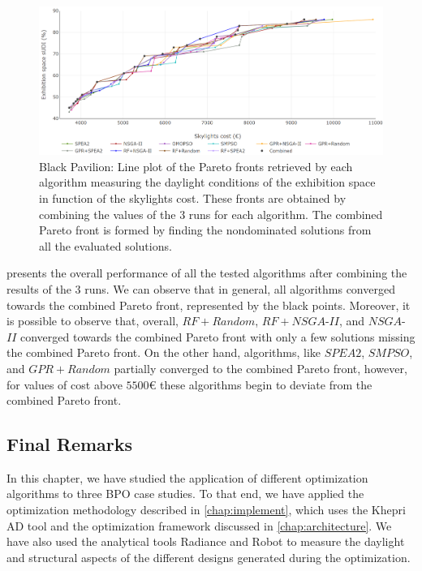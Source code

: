 \begin{figure}[htbp]
	\centering
	\includegraphics[width=\textwidth]{Images/Evaluation/BlackPavilion/All_Algorithms_all_runs-2019-04-16.png}
	\caption[Black Pavilion: Pareto front plot]{Black Pavilion: Line plot of the Pareto fronts retrieved by each algorithm measuring the daylight conditions of the exhibition space in function of the skylights cost. These fronts are obtained by combining the values of the $3$ runs for each algorithm. The combined Pareto front is formed by finding the nondominated solutions from all the evaluated solutions.}
	\label{fig:blackpavilionallruns}
\end{figure}

 presents the overall performance of all the tested algorithms after combining the results of the $3$ runs. We can observe that in general, all algorithms converged towards the combined Pareto front, represented by the black points. Moreover, it is possible to observe that, overall, $RF+Random$, $RF+NSGA$-$II$, and $NSGA$-$II$ converged towards the combined Pareto front with only a few solutions missing the combined Pareto front. On the other hand, algorithms, like $SPEA2$, $SMPSO$, and $GPR+Random$ partially converged to the combined Pareto front, however, for values of cost above $5500$€ these algorithms begin to deviate from the combined Pareto front.

\subsection{Final Remarks}

In this chapter, we have studied the application of different optimization algorithms to three \ac{BPO} case studies. To that end, we have applied the optimization methodology described in \cref{chap:implement}, which uses the Khepri \ac{AD} tool and the optimization framework discussed in \cref{chap:architecture}. We have also used the analytical tools Radiance and Robot to measure the daylight and structural aspects of the different designs generated during the optimization.

